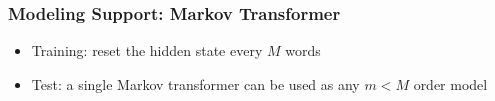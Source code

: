 \documentclass{beamer}
\begin{document}
\begin{frame}
\frametitle{Modeling Support: Markov Transformer}
\begin{center}
\end{center}
\begin{itemize}
    \item<3-> Training: reset the hidden state every $M$ words
    \item<5-> Test: a single Markov transformer can be used as any $m<M$ order model
\end{itemize}
\begin{overlayarea}{\textwidth}{6.5cm}
\begin{columns}
\begin{column}{0.68\textwidth}
\centering
{}
\end{column}
\begin{column}{0.27\textwidth}
\centering

\end{column}
\end{columns}
\end{overlayarea}
\end{frame}
\end{document}
